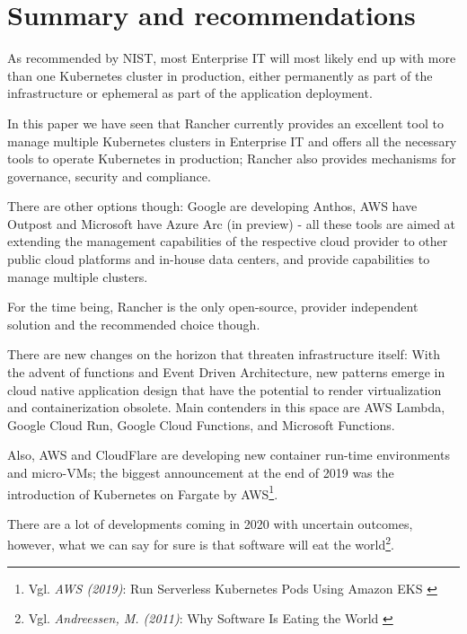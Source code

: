 %
%

\pagebreak
\section{Summary and recommendations}

\onehalfspacing

As recommended by NIST, most Enterprise IT will most likely end up with more than one Kubernetes cluster in production, either permanently as part of the infrastructure or ephemeral as part of the application deployment.

In this paper we have seen that Rancher currently provides an excellent tool to manage multiple Kubernetes clusters in Enterprise IT and offers all the necessary tools to operate Kubernetes in production; Rancher also provides mechanisms for governance, security and compliance.

There are other options though: Google are developing Anthos, AWS have Outpost and Microsoft have Azure Arc (in preview) - all these tools are aimed at extending the management capabilities of the respective cloud provider to other public cloud platforms and in-house data centers, and provide capabilities to manage multiple clusters.

For the time being, Rancher is the only open-source, provider independent solution and the recommended choice though.

There are new changes on the horizon that threaten infrastructure itself: With the advent of functions and Event Driven Architecture, new patterns emerge in cloud native application design that have the potential to render virtualization and containerization obsolete. Main contenders in this space are AWS Lambda, Google Cloud Run, Google Cloud Functions, and Microsoft Functions.

Also, AWS and CloudFlare are developing new container run-time environments and micro-VMs; the biggest announcement at the end of 2019 was the introduction of Kubernetes on Fargate by AWS\footnote{Vgl. \textit{AWS (2019)}: Run Serverless Kubernetes Pods Using Amazon EKS \cite{eksFargate}}.

There are a lot of developments coming in 2020 with uncertain outcomes, however, what we can say for sure is that software will eat the world\footnote{Vgl. \textit{Andreessen, M. (2011)}: Why Software Is Eating the World \cite{softwareEats}}.
